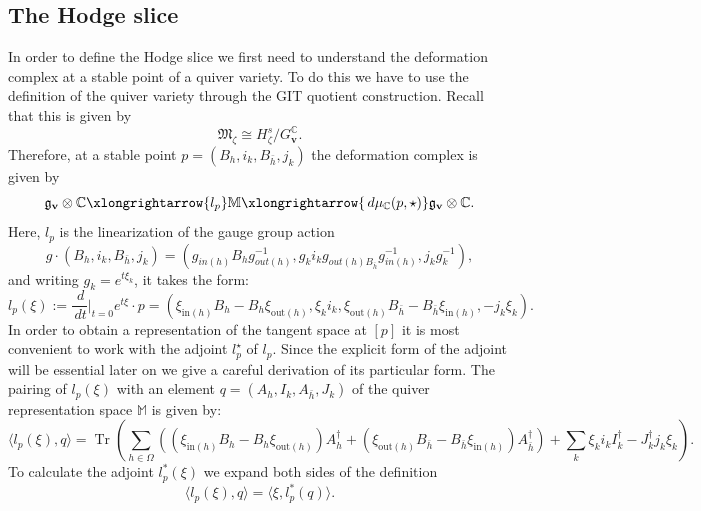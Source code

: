 \documentclass[12pt,oneside,reqno]{amsart}
\theoremstyle{definition}
\numberwithin{equation}{section}
\numberwithin{theorem}{section}
\newcommand{\C}{\mathbb{C}}
\newcommand{\Tr}{\operatorname{Tr}}
\begin{document}
\subsection{The Hodge slice}


In order to define the Hodge slice we first need to understand the deformation complex at a stable point of a quiver variety. To do this we have to use the definition of the quiver variety through the GIT quotient construction. Recall that this is given by 
%
\begin{equation*}
\mathfrak M_{\zeta} \cong H_{\zeta}^s/ G_{\mathbf{v}}^{\C}. 
\end{equation*}
%
Therefore, at a stable point $p = (B_h,i_k,B_{\bar h},j_k)$ the deformation complex is given by 
%
\begin{equation}
\mathfrak g_{\mathbf{v}}\otimes \C \xlongrightarrow{l_p} \mathbb M \xlongrightarrow{ \,d\mu_{\C}(p,\star)} \mathfrak g_{\mathbf{v}}\otimes \C. 
\end{equation}
%
Here, $l_p$ is the linearization of the gauge group action 
%
\begin{equation}\label{gauge group}
    g\cdot(B_h,i_k,B_{\bar h},j_k)=(g_{in(h)}B_h g_{out(h)}^{-1},g_k i_kg_{out(h)B_{\bar h}}g_{in(h)}^{-1},j_kg_k^{-1}),
\end{equation}
%
and writing $g_k=e^{t\xi_k}$, it takes the form:
%
\begin{equation}
    l_p(\xi):=\frac{\,d}{\,dt}\Bigg|_{t=0} e^{t\xi}\cdot p = (\xi_{\text{in}(h)}B_h - B_h\xi_{\text{out}(h)}, \xi_ki_k, \xi_{\text{out}(h)}B_{\bar h} - B_{\bar h}\xi_{\text{in}(h)}, -j_k\xi_k).
\end{equation}
%
In order to obtain a representation of the tangent space at $[p]$ it is most convenient to work with the adjoint $l_p^{\star}$ of $l_p$. Since the explicit form of the adjoint will be essential later on we give a careful derivation of its particular form. The pairing of $l_p(\xi)$ with an element $q=(A_h,I_k,A_{\bar h},J_k)$ of the quiver representation space $\mathbb{M}$ is given by:
%
\begin{equation}\label{step1}
\langle l_p(\xi),q\rangle = \Tr\left( \sum\limits_{h\in \Omega} ((\xi_{\text{in}(h)}B_h - B_h\xi_{\text{out}(h)})A^{\dagger}_h+ (\xi_{\text{out}(h)}B_{\bar h} - B_{\bar h}\xi_{\text{in}(h)})A^{\dagger}_{\bar h}) +\sum\limits_k \xi_ki_kI_k^{\dagger} - J_k^{\dagger}j_k\xi_k \right).
\end{equation}
%
To calculate the adjoint $l_p^*(\xi)$ we expand both sides of the definition
%
\begin{equation}\label{adjoint}
    \langle l_p(\xi),q\rangle=\langle\xi,l_p^*(q)\rangle.
\end{equation}
\end{document}
